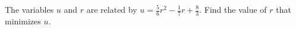 The variables $u$ and $r$ are related by $u=\frac{5}{6}r^2-\frac{1}{7}r+\frac{8}{3}$.
Find the value of $r$ that minimizes $u$.
\answercheck
